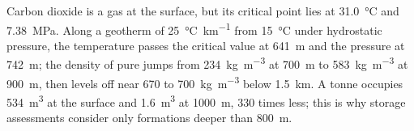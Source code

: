 Carbon dioxide is a gas at the surface, but its critical point lies at \qty{31.0}{\celsius} and
\qty{7.38}{MPa}. Along a geotherm of \qty{25}{\celsius\per\km} from \qty{15}{\celsius} under
hydrostatic pressure, the temperature passes the critical value at \qty{641}{m} and the pressure at
\qty{742}{m}; the density of pure  jumps from \qty{234}{kg.m^{-3}} at \qty{700}{m} to
\qty{583}{kg.m^{-3}} at \qty{900}{m}, then levels off near 670 to \qty{700}{kg.m^{-3}} below
\qty{1.5}{km}. A tonne occupies \qty{534}{m^3} at the surface and \qty{1.6}{m^3} at \qty{1000}{m},
330 times less; this is why storage assessments consider only formations deeper than
\qty{800}{m}.


